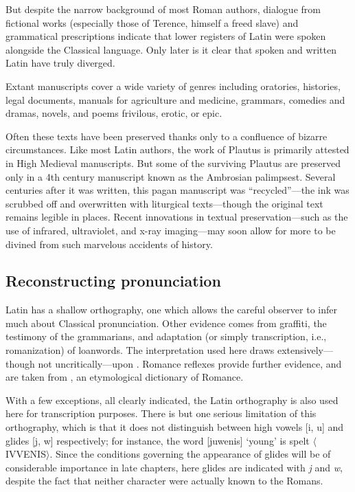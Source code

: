 But despite the narrow background of most Roman authors, dialogue from fictional works (especially those of Terence, himself a freed slave) and grammatical prescriptions indicate that lower registers of Latin were spoken alongside the Classical language.
Only later is it clear that spoken and written Latin have truly diverged.

Extant manuscripts cover a wide variety of genres including oratories, histories, legal documents, manuals for agriculture and medicine, grammars, comedies and dramas, novels, and poems frivilous, erotic, or epic.

Often these texts have been preserved thanks only to a confluence of bizarre circumstances.
Like most Latin authors, the work of Plautus is primarily attested in High Medieval manuscripts.
But some of the surviving Plautus are preserved only in a 4th century manuscript known as the Ambrosian palimpsest.
Several centuries after it was written, this pagan manuscript was ``recycled''---the ink was scrubbed off and overwritten with liturgical texts---though the original text remains legible in places.
Recent innovations in textual preservation---such as the use of infrared, ultraviolet, and x-ray imaging---may soon allow for more to be divined from such marvelous accidents of history.

\subsection{Reconstructing pronunciation}

Latin has a shallow orthography, one which allows the careful observer to infer much about Classical pronunciation.
Other evidence comes from graffiti, the testimony of the grammarians, and adaptation (or simply transcription, i.e., romanization) of loanwords.
The interpretation used here draws extensively---though not uncritically---upon \citealt{Allen1978}.
Romance reflexes provide further evidence, and are taken from \citealt{Meyer-Lubke1935}, an etymological dictionary of Romance.

With a few exceptions, all clearly indicated, the Latin orthography is also used here for transcription purposes. 
There is but one serious limitation of this orthography, which is that it does not distinguish between high vowels [i, u] and glides [j, w] respectively; 
for instance, the word [juwenis] `young' is spelt $\langle$IVVENIS$\rangle$.
Since the conditions governing the appearance of glides will be of considerable importance in late chapters, here glides are indicated with \emph{j} and \emph{w}, despite the fact that neither character were actually known to the Romans.

